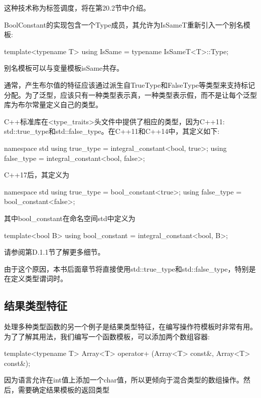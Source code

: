 这种技术称为标签调度，将在第20.2节中介绍。

BoolConstant的实现包含一个Type成员，其允许为IsSameT重新引入一个别名模板:

\begin{cpp}
template<typename T>
using IsSame = typename IsSameT<T>::Type;
\end{cpp}

别名模板可以与变量模板isSame共存。

通常，产生布尔值的特征应该通过派生自TrueType和FalseType等类型来支持标记分配。为了泛型，应该只有一种类型表示真，一种类型表示假，而不是让每个泛型库为布尔常量定义自己的类型。

C++标准库在<type\_traits>头文件中提供了相应的类型，因为C++11: std::true\_type和std::false\_type。在C++11和C++14中，其定义如下:

\begin{cpp}
namespace std {
	using true_type = integral_constant<bool, true>;
	using false_type = integral_constant<bool, false>;
}
\end{cpp}

C++17后，其定义为

\begin{cpp}
namespace std {
	using true_type = bool_constant<true>;
	using false_type = bool_constant<false>;
}
\end{cpp}

其中bool\_constant在命名空间std中定义为

\begin{cpp}
template<bool B>
using bool_constant = integral_constant<bool, B>;
\end{cpp}

请参阅第D.1.1节了解更多细节。

由于这个原因，本书后面章节将直接使用std::true\_type和std::false\_type，特别是在定义类型谓词时。

\subsection{结果类型特征} 

处理多种类型函数的另一个例子是结果类型特征，在编写操作符模板时非常有用。为了了解其用法，我们编写一个函数模板，可以添加两个数组容器:

\begin{cpp}
template<typename T>
Array<T> operator+ (Array<T> const&, Array<T> const&);
\end{cpp}

因为语言允许在int值上添加一个char值，所以更倾向于混合类型的数组操作。然后，需要确定结果模板的返回类型

